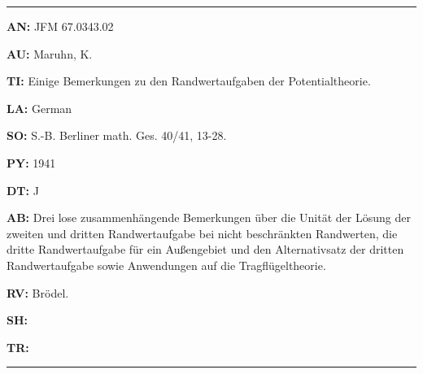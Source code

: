 \bigskip\par\noindent\hrule\bigskip\par

\item{\bf AN:} JFM 67.0343.02
\item{\bf AU:} Maruhn, K.
\item{\bf TI:} Einige Bemerkungen zu den Randwertaufgaben der Potentialtheorie.
\item{\bf LA:} German
\item{\bf SO:} S.-B. Berliner math. Ges. 40/41, 13-28.
\item{\bf PY:} 1941
\item{\bf DT:} J
\item{\bf AB:}{\parindent15pt
 Drei lose zusammenh\"angende Bemerkungen \"uber die Unit\"at der L\"osung
der
zweiten und dritten
Randwertaufgabe bei nicht beschr\"ankten Randwerten, die dritte
Randwertaufgabe f\"ur ein Au{\ss}engebiet und den Alternativsatz der dritten
Randwertaufgabe sowie Anwendungen auf die Tragfl\"ugeltheorie.
}
\item{\bf RV:} Br\"odel.
\item{\bf SH:}
\item{\bf TR:}

\bigskip\par\noindent\hrule\bigskip\par

